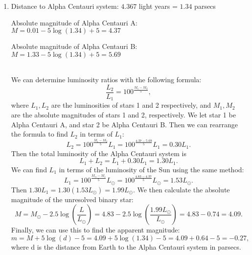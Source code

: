 \documentclass[11pt,letterpaper]{article}
\begin{document}
\begin{enumerate}[label=(\alph*)]
		\item
		Distance to Alpha Centauri system: $4.367$ light years = $1.34$ parsecs
		
		Absolute magnitude of Alpha Centauri A: $M = 0.01 - 5\log(1.34) + 5 = 4.37$
		
		Absolute magnitude of Alpha Centauri B: $M = 1.33 - 5\log(1.34) + 5 = 5.69$
		
		\\
		
		We can determine luminosity ratios with the following formula: $$\frac{L_2}{L_1} = 100^{\frac{M_1 - M_2}{5}},$$ where $L_1, L_2$ are the luminosities of stars 1 and 2 respectively, and $M_1, M_2$ are the absolute magnitudes of stars 1 and 2, respectively. We let star 1 be Alpha Centauri A, and star 2 be Alpha Centauri B. Then we can rearrange the formula to find $L_2$ in terms of $L_1$: $$L_2 = 100^{\frac{M_1 - M_2}{5}} L_1 = 100^{\frac{4.37 - 5.69}{5}} L_1 = 0.30 L_1.$$ Then the total luminosity of the Alpha Centauri system is $$L_1 + L_2 = L_1 + 0.30 L_1 = 1.30 L_1.$$ We can find $L_1$ in terms of the luminosity of the Sun using the same method: $$L_1 = 100^{\frac{M_\odot - M_1}{5}} L_\odot = 100^{\frac{4.83 - 4.37}{5}} L_\odot = 1.53 L_\odot.$$ Then $1.30 L_1 = 1.30 (1.53 L_\odot) = 1.99 L_\odot.$ We then calculate the absolute magnitude of the unresolved binary star: $$M = M_\odot - 2.5\log(\frac{L}{L_\odot}) = 4.83 - 2.5\log(\frac{1.99L_\odot}{L_\odot}) = 4.83 - 0.74 = 4.09.$$ Finally, we can use this to find the apparent magnitude: $$m = M + 5\log(d) - 5 = 4.09 + 5\log(1.34) - 5 = 4.09 + 0.64 - 5 = -0.27,$$ where d is the distance from Earth to the Alpha Centauri system in parsecs. 
		
	\end{enumerate}
	
\end{document}
